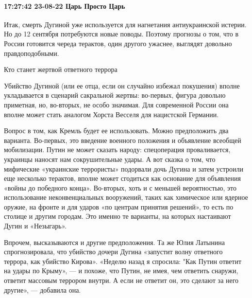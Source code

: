  
 
 
 
 

\paragraph{17:27:42 23-08-22 Царь Просто Царь}

Итак, смерть Дугиной уже используется для нагнетания антиукраинской истерии. Но
до 12 сентября потребуются новые поводы. Поэтому прогнозы о том, что в России
готовится череда терактов, один другого ужаснее, выглядят довольно
правдоподобными.

Кто станет жертвой ответного террора

Убийство Дугиной (или ее отца, если он случайно избежал покушения) вполне
укладывается в сценарий сакральной жертвы: во-первых, фигура довольно
приметная, но, во-вторых, не особо значимая. Для современной России она вполне
может стать аналогом Хорста Весселя для нацистской Германии.

Вопрос в том, как Кремль будет ее использовать. Можно предположить два
варианта. Во-первых, это введение военного положения и объявление всеобщей
мобилизации. Путин не может сказать народу: спецоперация проваливается,
украинцы наносят нам сокрушительные удары. А вот сказка о том, что мифические
«украинские террористы» подорвали дочь Дугина и затем устроили еще несколько
терактов, вполне может сгодиться как основание для объявления «войны до
победного конца». Во-вторых, хоть и с меньшей вероятностью, это использование
неконвенциальных вооружений, таких как химическое или ядерное оружие, на фронте
и для ударов «по центрам принятия решений», то есть по столице и другим
городам. Это именно те варианты, на которых настаивают Дугин и «Незыгарь».

Впрочем, высказываются и другие предположения. Та же Юлия Латынина
спрогнозировала, что убийство дочери Дугина «запустит волну ответного террора,
как убийство Кирова». «Неделю назад я спросила: "Как Путин ответит на удары по
Крыму», — и похоже, что Путин, не имея, чем ответить снаружи, ответит массовым
террором внутри. А если не ответит он, это сделают за него другие», — добавила
она.
